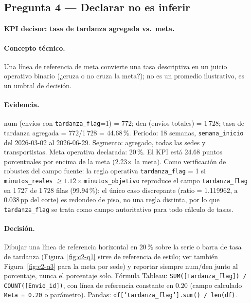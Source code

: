\subsection{Pregunta 4 --- Declarar no es inferir}\label{ssec:c2-q4}

\paragraph{KPI decisor: tasa de tardanza agregada vs.\ meta.}

\paragraph{Concepto técnico.} Una línea de referencia de meta convierte una tasa descriptiva en un juicio operativo binario (¿cruza o no cruza la meta?); no es un promedio ilustrativo, es un umbral de decisión.

\paragraph{Evidencia.} $\text{num}$ (envíos con \lstinline|tardanza_flag|=1) = 772; $\text{den}$ (envíos totales) = 1\,728; tasa de tardanza agregada = 772/1\,728 = 44.68\,\%. Periodo: 18 semanas, \lstinline|semana_inicio| del 2026-03-02 al 2026-06-29. Segmento: agregado, todas las sedes y transportistas. Meta operativa declarada: 20\,\%. El KPI está 24.68 puntos porcentuales por encima de la meta (2.23$\times$ la meta). Como verificación de robustez del campo fuente: la regla operativa \lstinline|tardanza_flag| = 1 si \lstinline|minutos_reales| $\ge 1.12\times$\lstinline|minutos_objetivo| reproduce el campo \lstinline|tardanza_flag| en 1\,727 de 1\,728 filas (99.94\,\%); el único caso discrepante (ratio = 1.119962, a 0.038\,pp del corte) es redondeo de piso, no una regla distinta, por lo que \lstinline|tardanza_flag| se trata como campo autoritativo para todo cálculo de tasas.

\paragraph{Decisión.} Dibujar una línea de referencia horizontal en 20\,\% sobre la serie o barra de tasa de tardanza (Figura~\ref{fig:c2-q1} sirve de referencia de estilo; ver también Figura~\ref{fig:c2-q3} para la meta por sede) y reportar siempre $\text{num}/\text{den}$ junto al porcentaje, nunca el porcentaje solo. Fórmula Tableau: \texttt{SUM([Tardanza\_flag]) / COUNT([Envio\_id])}, con línea de referencia constante en 0.20 (campo calculado \texttt{Meta = 0.20} o parámetro). Pandas: \texttt{df['tardanza\_flag'].sum() / len(df)}.

